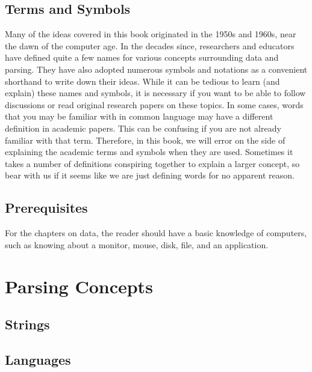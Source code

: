 \documentclass{book}
\begin{document}
\section*{Terms and Symbols}
Many of the ideas covered in this book originated in the 1950s and 
1960s, near the dawn of the computer age. In the decades since,
researchers and educators have defined quite a few names for various
concepts surrounding data and parsing. They have also adopted numerous
symbols and notations as a convenient shorthand to write down their ideas.
While it can be tedious to learn (and explain) these names and symbols, it
is necessary if you want to be able to follow discussions or read
original research papers on these topics. In some cases, words that you may
be familiar with in common language may have a different definition in 
academic papers. This can be confusing if you are not already familiar with
that term. Therefore, in this book, we will error on the side of explaining
the academic terms and symbols when they are used. Sometimes it takes a 
number of definitions conspiring together to explain a larger concept, so
bear with us if it seems like we are just defining words for no apparent
reason.

\section*{Prerequisites}
For the chapters on data, the reader should have a basic knowledge of
computers, such as knowing about a monitor, mouse, disk, file, and an
application.

\setcounter{tocdepth}{4}
\setcounter{secnumdepth}{4}
\tableofcontents

\mainmatter



%
%
\chapter{Parsing Concepts}\label{chpar}

\section{Strings}

\section{Languages}
\end{document}
